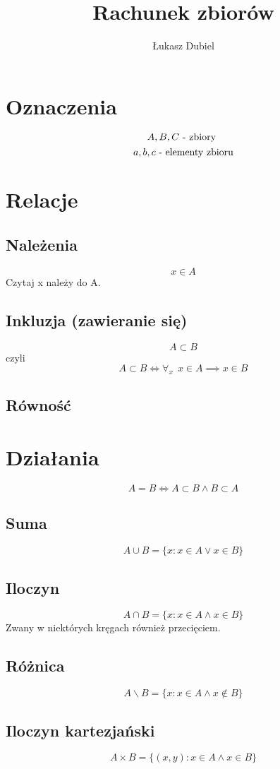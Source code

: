 \documentclass[11pt]{article}
\author{Łukasz Dubiel}
\title{Rachunek zbiorów}
\begin{document}
\maketitle

\section{Oznaczenia}
$$ A, B, C \hbox{ - zbiory }$$
$$ a, b, c \hbox{ - elementy zbioru}$$

\section{Relacje}
\subsection{Należenia}
$$ x \in A $$
Czytaj x należy do A.
\subsection{Inkluzja (zawieranie się)}
$$ A \subset B $$
czyli $$ A \subset B \iff \forall_x\ \ x \in A \implies x \in B$$

\subsection{Równość}
\section{Działania}
$$ A = B \iff A \subset B \wedge B \subset A $$
\subsection{Suma}
$$ A \cup B = \{ x : x \in A \vee x \in B\}$$
\subsection{Iloczyn}
$$ A \cap B = \{ x : x \in A \wedge x \in B\}$$
Zwany w niektórych kręgach również przecięciem.
\subsection{Różnica}
$$ A \backslash B = \{ x : x \in A \wedge x \not \in B \}$$
\subsection{Iloczyn kartezjański}
$$ A \times B = \{ (x,y) : x \in A \wedge x \in B \} $$
\end{document}
